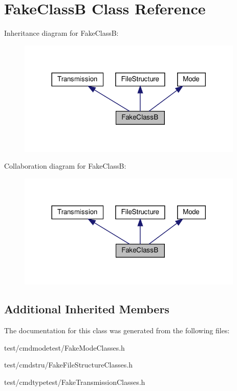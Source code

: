 \hypertarget{classFakeClassB}{}\section{Fake\+ClassB Class Reference}
\label{classFakeClassB}


Inheritance diagram for Fake\+ClassB\+:
\nopagebreak
\begin{figure}[H]
\begin{center}
\leavevmode
\includegraphics[width=305pt]{classFakeClassB__inherit__graph}
\end{center}
\end{figure}


Collaboration diagram for Fake\+ClassB\+:
\nopagebreak
\begin{figure}[H]
\begin{center}
\leavevmode
\includegraphics[width=305pt]{classFakeClassB__coll__graph}
\end{center}
\end{figure}
\subsection*{Additional Inherited Members}


The documentation for this class was generated from the following files\+:\begin{DoxyCompactItemize}
\item 
test/cmdmodetest/Fake\+Mode\+Classes.\+h\item 
test/cmdstru/Fake\+File\+Structure\+Classes.\+h\item 
test/cmdtypetest/Fake\+Transmission\+Classes.\+h\end{DoxyCompactItemize}
